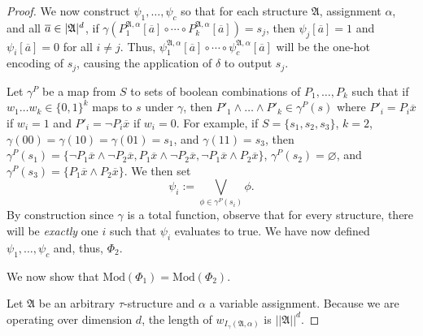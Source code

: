 \documentclass[a4paper,UKenglish,cleveref, autoref, thm-restate, anonymous]{lipics-v2021}
\begin{document}
\begin{proof}
    We now construct $\psi_1, \dots, \psi_c$ so that for each structure $\mathfrak{A}$, assignment $\alpha$, and all $\overline{a} \in |\mathfrak{A}|^d$, if $\gamma(P^{\mathfrak{A},\alpha}_1[\overline{a}] \circ \cdots \circ P^{\mathfrak{A},\alpha}_k[\overline{a}]) = s_j$, then $\psi_j[\overline{a}] = 1$ and $\psi_i[\overline{a}] = 0$ for all $i \neq j$. Thus, $\psi_1^{\mathfrak{A},\alpha}[\overline{a}] \circ \cdots \circ \psi_c^{\mathfrak{A},\alpha}[\overline{a}]$ will be the one-hot encoding of $s_j$, causing the application of $\delta$ to output $s_j$.

    Let $\gamma^P$ be a map from $S$ to sets of boolean combinations of $P_1,\dots,P_k$ such that if $w_1\dots w_k \in \{0,1\}^k$ maps to $s$ under $\gamma$, then $P'_1 \wedge \dots \wedge P'_k \in \gamma^P(s)$ where $P'_i = P_i \overline{x}$ if $w_i = 1$ and $P'_i = \neg P_i \overline{x}$ if $w_i = 0$. For example, if $S = \{s_1, s_2, s_3\}$, $k=2$, $\gamma(00) = \gamma(10) = \gamma(01) = s_1$, and $\gamma(11) = s_3$, then $\gamma^P(s_1) = \{\neg P_1\overline{x} \wedge \neg P_2\overline{x}, P_1\overline{x} \wedge \neg P_2\overline{x}, \neg P_1\overline{x} \wedge P_2\overline{x}\}$, $\gamma^P(s_2) = \varnothing$, and $\gamma^P(s_3) = \{P_1\overline{x} \wedge P_2\overline{x}\}$. We then set \[\psi_i := \bigvee_{\phi \in \gamma^P(s_i)} \phi.\] By construction since $\gamma$ is a total function, observe that for every structure, there will be \emph{exactly} one $i$ such that $\psi_i$ evaluates to true. We have now defined $\psi_1, \dots, \psi_c$ and, thus, $\Phi_2$.
    
    We now show that $\text{Mod}(\Phi_1) = \text{Mod}(\Phi_2)$.

    Let $\mathfrak{A}$ be an arbitrary $\tau$-structure and $\alpha$ a variable assignment. Because we are operating over dimension $d$, the length of $w_{I_\gamma(\mathfrak{A},\alpha)}$ is $||\mathfrak{A}||^d$. 
    

\end{proof}
\end{document}
